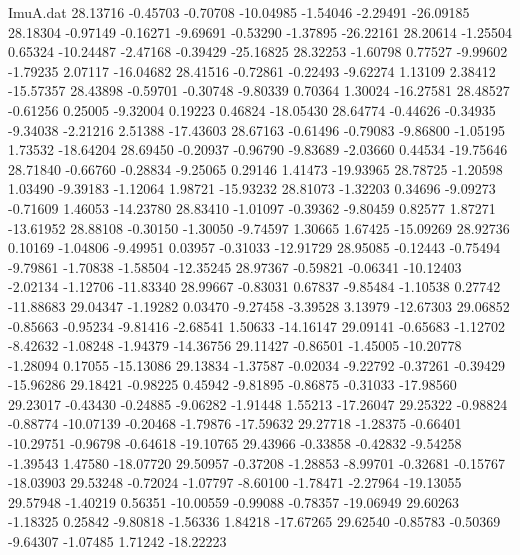 \begin{filecontents}{ImuA.dat}
  28.13716   -0.45703   -0.70708  -10.04985   -1.54046   -2.29491  -26.09185
  28.18304   -0.97149   -0.16271   -9.69691   -0.53290   -1.37895  -26.22161
  28.20614   -1.25504    0.65324  -10.24487   -2.47168   -0.39429  -25.16825
  28.32253   -1.60798    0.77527   -9.99602   -1.79235    2.07117  -16.04682
  28.41516   -0.72861   -0.22493   -9.62274    1.13109    2.38412  -15.57357
  28.43898   -0.59701   -0.30748   -9.80339    0.70364    1.30024  -16.27581
  28.48527   -0.61256    0.25005   -9.32004    0.19223    0.46824  -18.05430
  28.64774   -0.44626   -0.34935   -9.34038   -2.21216    2.51388  -17.43603
  28.67163   -0.61496   -0.79083   -9.86800   -1.05195    1.73532  -18.64204
  28.69450   -0.20937   -0.96790   -9.83689   -2.03660    0.44534  -19.75646
  28.71840   -0.66760   -0.28834   -9.25065    0.29146    1.41473  -19.93965
  28.78725   -1.20598    1.03490   -9.39183   -1.12064    1.98721  -15.93232
  28.81073   -1.32203    0.34696   -9.09273   -0.71609    1.46053  -14.23780
  28.83410   -1.01097   -0.39362   -9.80459    0.82577    1.87271  -13.61952
  28.88108   -0.30150   -1.30050   -9.74597    1.30665    1.67425  -15.09269
  28.92736    0.10169   -1.04806   -9.49951    0.03957   -0.31033  -12.91729
  28.95085   -0.12443   -0.75494   -9.79861   -1.70838   -1.58504  -12.35245
  28.97367   -0.59821   -0.06341  -10.12403   -2.02134   -1.12706  -11.83340
  28.99667   -0.83031    0.67837   -9.85484   -1.10538    0.27742  -11.88683
  29.04347   -1.19282    0.03470   -9.27458   -3.39528    3.13979  -12.67303
  29.06852   -0.85663   -0.95234   -9.81416   -2.68541    1.50633  -14.16147
  29.09141   -0.65683   -1.12702   -8.42632   -1.08248   -1.94379  -14.36756
  29.11427   -0.86501   -1.45005  -10.20778   -1.28094    0.17055  -15.13086
  29.13834   -1.37587   -0.02034   -9.22792   -0.37261   -0.39429  -15.96286
  29.18421   -0.98225    0.45942   -9.81895   -0.86875   -0.31033  -17.98560
  29.23017   -0.43430   -0.24885   -9.06282   -1.91448    1.55213  -17.26047
  29.25322   -0.98824   -0.88774  -10.07139   -0.20468   -1.79876  -17.59632
  29.27718   -1.28375   -0.66401  -10.29751   -0.96798   -0.64618  -19.10765
  29.43966   -0.33858   -0.42832   -9.54258   -1.39543    1.47580  -18.07720
  29.50957   -0.37208   -1.28853   -8.99701   -0.32681   -0.15767  -18.03903
  29.53248   -0.72024   -1.07797   -8.60100   -1.78471   -2.27964  -19.13055
  29.57948   -1.40219    0.56351  -10.00559   -0.99088   -0.78357  -19.06949
  29.60263   -1.18325    0.25842   -9.80818   -1.56336    1.84218  -17.67265
  29.62540   -0.85783   -0.50369   -9.64307   -1.07485    1.71242  -18.22223

\end{filecontents}
